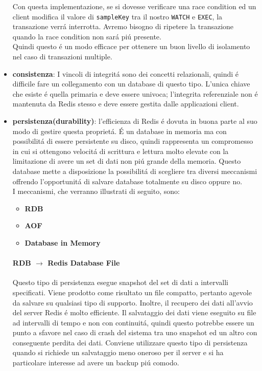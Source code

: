 \begin{itemize}
    Con questa implementazione, se si dovesse verificare una race condition ed un client modifica il valore di \texttt{sampleKey} tra il nostro
    \texttt{WATCH} e \texttt{EXEC}, la transazione verrá interrotta. Avremo bisogno di ripetere la transazione quando la race condition non sará
    piú presente.\\
    Quindi questo é un modo efficace per ottenere un buon livello di isolamento nel caso di transazioni multiple.

    \item \textbf{consistenza}: I vincoli di integritá sono dei concetti relazionali, quindi é difficile fare un collegamento con un database di questo tipo.
    L'unica chiave che esiste é quella primaria e deve essere univoca;
    l'integrita referenziale non é mantenuta da Redis stesso e deve essere gestita dalle applicazioni client.

    \item \textbf{persistenza(durability)}:
    l'efficienza di Redis é dovuta in buona parte al suo modo di gestire questa proprietá.
    É un database in memoria ma con possibilitá di essere persistente su disco, quindi rappresenta un compromesso in cui si ottengono
    velocitá di scrittura e lettura molto elevate con la limitazione di avere un set di dati non piú grande della memoria.
    Questo database mette a disposizione la possibilitá di scegliere tra diversi meccanismi
    offrendo l'opportunitá di salvare database
    totalmente su disco oppure no.\\
    I meccanismi, che verranno illustrati di seguito, sono:
      \begin{itemize}
          \item \textbf{RDB}
          \item \textbf{AOF}
          \item \textbf{Database in Memory}
      \end{itemize}%
        
       \paragraph{RDB $\to$ Redis Database File}
         Questo tipo di persistenza esegue snapshot del set di dati a intervalli specificati. Viene prodotto come risultato un file
         compatto, pertanto agevole da salvare su qualsiasi tipo di supporto. Inoltre, il recupero dei dati all'avvio del server Redis
         é molto efficiente.
         Il salvataggio dei dati viene eseguito su file ad intervalli di tempo e non con continuitá, quindi questo potrebbe essere un punto a sfavore
         nel caso di crash del sistema tra uno snapshot ed un altro con conseguente perdita dei dati.
         Conviene utilizzare questo tipo di persistenza quando si richiede un salvataggio meno oneroso per il server e si ha particolare interesse
         ad avere un backup piú comodo.


\end{itemize}
